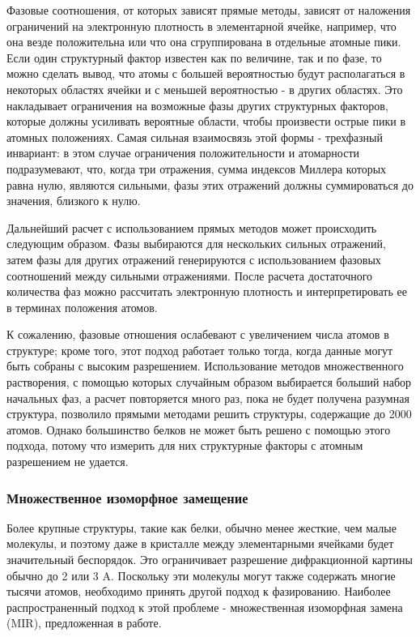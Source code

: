 \documentclass{article}
\begin{document}
Фазовые соотношения, от которых зависят прямые методы, зависят от наложения ограничений на электронную плотность в элементарной ячейке, например, что она везде положительна или что она сгруппирована в отдельные атомные пики. Если один структурный фактор известен как по величине, так и по фазе, то можно сделать вывод, что атомы с большей вероятностью будут располагаться в некоторых областях ячейки и с меньшей вероятностью - в других областях. Это накладывает ограничения на возможные фазы других структурных факторов, которые должны усиливать вероятные области, чтобы произвести острые пики в атомных положениях. Самая сильная взаимосвязь этой формы - трехфазный инвариант: в этом случае ограничения положительности и атомарности подразумевают, что, когда три отражения, сумма индексов Миллера которых равна нулю, являются сильными, фазы этих отражений должны суммироваться до значения, близкого к нулю\cite{ThreePhase}.

Дальнейший расчет с использованием прямых методов может происходить следующим образом. Фазы выбираются для нескольких сильных отражений, затем фазы для других отражений генерируются с использованием фазовых соотношений между сильными отражениями. После расчета достаточного количества фаз можно рассчитать электронную плотность и интерпретировать ее в терминах положения атомов.

К сожалению, фазовые отношения ослабевают с увеличением числа атомов в структуре; кроме того, этот подход работает только тогда, когда данные могут быть собраны с высоким разрешением. Использование методов множественного растворения, с помощью которых случайным образом выбирается больший набор начальных фаз, а расчет повторяется много раз, пока не будет получена разумная структура, позволило прямыми методами решить структуры, содержащие до 2000 атомов. Однако большинство белков не может быть решено с помощью этого подхода, потому что измерить для них структурные факторы с атомным разрешением не удается.

\subsubsection{Множественное изоморфное замещение}
Более крупные структуры, такие как белки, обычно менее жесткие, чем малые молекулы, и поэтому даже в кристалле между элементарными ячейками будет значительный беспорядок. Это ограничивает разрешение дифракционной картины обычно до 2 или 3 A. Поскольку эти молекулы могут также содержать многие тысячи атомов, необходимо принять другой подход к фазированию. Наиболее распространенный подход к этой проблеме - множественная изоморфная замена (MIR), предложенная в работе\cite{PERUTZ1960}.
\end{document}
